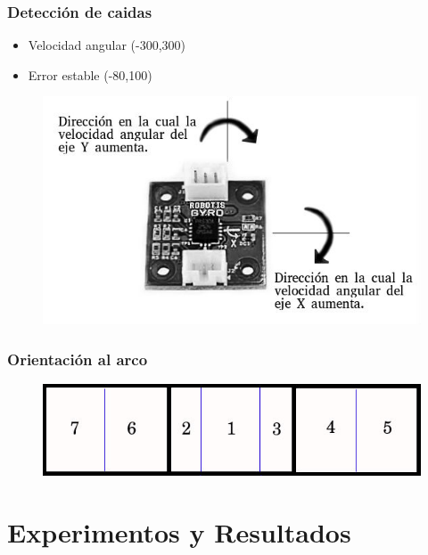 \documentclass{beamer}
\begin{document}
\begin{frame}
\frametitle{Detecci\'on de caidas}

\begin{itemize}
 \item Velocidad angular (-300,300)
 \item Error estable (-80,100)
\end{itemize}

\begin{figure}[hbtp]
\centering
\includegraphics[scale=0.3]{gyroDireccion.jpg} 
\end{figure}

\end{frame}



\begin{frame}
\frametitle{Orientaci\'on al arco}

\begin{figure}[hbtp]
\centering
\includegraphics[scale=0.4]{RegionesArco.jpg} 
\end{figure}

\end{frame}


\section{Experimentos y Resultados}
\end{document}
